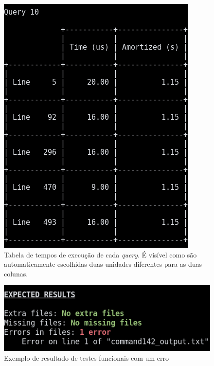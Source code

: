 \documentclass[12pt, a4paper]{article}
\begin{document}
\begin{figure}[H]
    \centering
    \includegraphics[scale=0.5]{res-fase2/testing_screenshots/query.png}
    \caption{Tabela de tempos de execução de cada \emph{query}. É visível como são automaticamente
             escolhidas duas unidades diferentes para as duas colunas.}
    \label{fig:q10-screenshot}
\end{figure}

\begin{figure}[H]
    \centering
    \includegraphics[scale=0.6]{res-fase2/testing_screenshots/diff.png}
    \caption{Exemplo de resultado de testes funcionais com um erro}
    \label{fig:diff-screenshot}
\end{figure}
\end{document}
